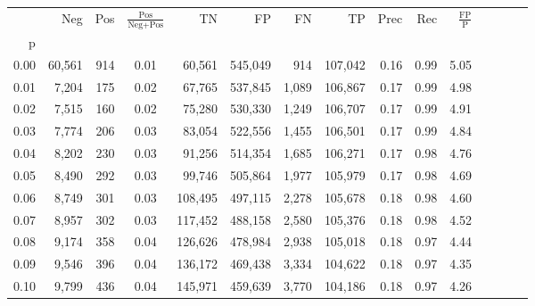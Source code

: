 \begin{tabular}{rrrcrrrrrrrrrrr}
\toprule
{} &     Neg &     Pos & $\frac{\text{Pos}}{\text{Neg}+\text{Pos}}$ &       TN &       FP &       FN &       TP &  Prec &   Rec & $\frac{\text{FP}}{\text{P}}$ \\
p    &         &         &                                            &          &          &          &          &       &       &                              \\
\midrule
0.00 &  60,561 &     914 &                                       0.01 &   60,561 &  545,049 &      914 &  107,042 &  0.16 &  0.99 &                         5.05 \\
0.01 &   7,204 &     175 &                                       0.02 &   67,765 &  537,845 &    1,089 &  106,867 &  0.17 &  0.99 &                         4.98 \\
0.02 &   7,515 &     160 &                                       0.02 &   75,280 &  530,330 &    1,249 &  106,707 &  0.17 &  0.99 &                         4.91 \\
0.03 &   7,774 &     206 &                                       0.03 &   83,054 &  522,556 &    1,455 &  106,501 &  0.17 &  0.99 &                         4.84 \\
0.04 &   8,202 &     230 &                                       0.03 &   91,256 &  514,354 &    1,685 &  106,271 &  0.17 &  0.98 &                         4.76 \\
0.05 &   8,490 &     292 &                                       0.03 &   99,746 &  505,864 &    1,977 &  105,979 &  0.17 &  0.98 &                         4.69 \\
0.06 &   8,749 &     301 &                                       0.03 &  108,495 &  497,115 &    2,278 &  105,678 &  0.18 &  0.98 &                         4.60 \\
0.07 &   8,957 &     302 &                                       0.03 &  117,452 &  488,158 &    2,580 &  105,376 &  0.18 &  0.98 &                         4.52 \\
0.08 &   9,174 &     358 &                                       0.04 &  126,626 &  478,984 &    2,938 &  105,018 &  0.18 &  0.97 &                         4.44 \\
0.09 &   9,546 &     396 &                                       0.04 &  136,172 &  469,438 &    3,334 &  104,622 &  0.18 &  0.97 &                         4.35 \\
0.10 &   9,799 &     436 &                                       0.04 &  145,971 &  459,639 &    3,770 &  104,186 &  0.18 &  0.97 &                         4.26 \\

\end{tabular}
